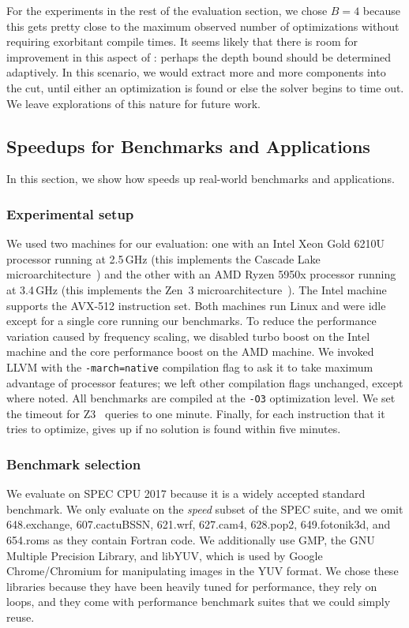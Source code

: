 For the experiments in the rest of the evaluation section, we chose
$B=4$ because this gets pretty close to the maximum observed number of
optimizations without requiring exorbitant compile times.
%
It seems likely that there is room for improvement in this aspect of
\minotaur: perhaps the depth bound should be determined adaptively.
%
In this scenario, we would extract more and more components into the
cut, until either an optimization is found or else the solver begins
to time out.
%
We leave explorations of this nature for future work.


\subsection{Speedups for Benchmarks and Applications}

In this section, we show how \minotaur{} speeds up real-world benchmarks
and applications.

\subsubsection{Experimental setup}
%
We used two machines for our evaluation: one with an Intel Xeon Gold
6210U processor running at 2.5\,GHz (this implements the Cascade Lake
microarchitecture~\cite{cascadelake}) and the other with an
AMD Ryzen 5950x processor
running at 3.4\,GHz (this implements the Zen~3 microarchitecture~\cite{zen3}).
The Intel machine supports the AVX-512 instruction set.
%
Both machines run Linux and were idle except for a single core running
our benchmarks.
%
To reduce the performance variation caused by frequency scaling, we
disabled turbo boost on the Intel machine and the core performance
boost on the AMD machine.
%
We invoked LLVM with the \texttt{-march=native} compilation flag to
ask it to take maximum advantage of processor features; we left other
compilation flags unchanged, except where noted.
%
All benchmarks are compiled at the \texttt{-O3} optimization level.
%
We set the timeout for Z3~\cite{z3} queries to one minute.
%
Finally, for each instruction that it tries to optimize, \minotaur{} gives
up if no solution is found within five minutes.


\subsubsection{Benchmark selection}
%
We evaluate on SPEC CPU 2017%
because it is a widely accepted standard
benchmark.
%
We only evaluate on the \emph{speed} subset of the SPEC suite, and we omit
648.exchange, 607.cactuBSSN, 621.wrf, 627.cam4, 628.pop2, 649.fotonik3d,
and 654.roms as they contain Fortran code.
%
We additionally use GMP, the GNU Multiple Precision Library, and libYUV,
which is used by Google Chrome/Chromium for manipulating images in the
YUV format.
%
We chose these libraries because they have been heavily tuned for
performance, they rely on loops, and they come with performance
benchmark suites that we could simply reuse.


